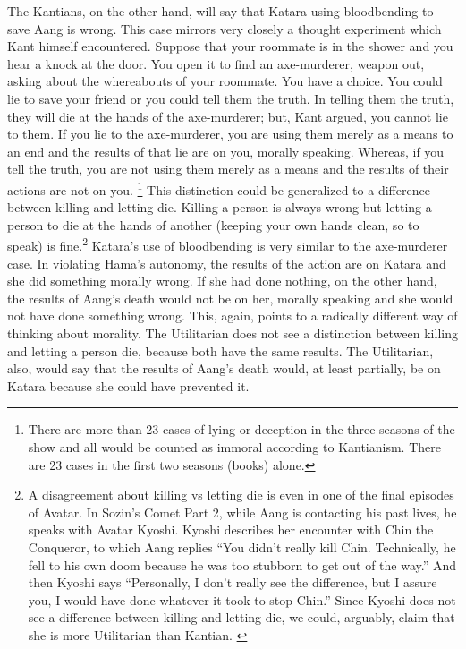 The Kantians, on the other hand, will say that Katara using bloodbending to save Aang is wrong. This case mirrors very closely a thought experiment which Kant himself encountered. Suppose that your roommate is in the shower and you hear a knock at the door. You open it to find an axe-murderer, weapon out, asking about the whereabouts of your roommate. You have a choice. You could lie to save your friend or you could tell them the truth. In telling them the truth, they will die at the hands of the axe-murderer; but, Kant argued, you cannot lie to them. If you lie to the axe-murderer, you are using them merely as a means to an end and the results of that lie are on you, morally speaking. Whereas, if you tell the truth, you are not using them merely as a means and the results of their actions are not on you.\autocite[346-350]{Beck1} \footnote{There are more than 23 cases of lying or deception in the three seasons of the show and all would be counted as immoral according to Kantianism. There are 23 cases in the first two seasons (books) alone.} This distinction could be generalized to a difference between killing and letting die. Killing a person is always wrong but letting a person to die at the hands of another (keeping your own hands clean, so to speak) is fine.\footnote{A disagreement about killing vs letting die is even in one of the final episodes of Avatar. In Sozin’s Comet Part 2, while Aang is contacting his past lives, he speaks with Avatar Kyoshi. Kyoshi describes her encounter with Chin the Conqueror, to which Aang replies “You didn't really kill Chin. Technically, he fell to his own doom because he was too stubborn to get out of the way.” And then Kyoshi says “Personally, I don't really see the difference, but I assure you, I would have done whatever it took to stop Chin.” Since Kyoshi does not see a difference between killing and letting die, we could, arguably, claim that she is more Utilitarian than Kantian. \cite[32:59-33:13]{Sozen1}} Katara’s use of bloodbending is very similar to the axe-murderer case. In violating Hama’s autonomy, the results of the action are on Katara and she did something morally wrong. If she had done nothing, on the other hand, the results of Aang’s death would not be on her, morally speaking and she would not have done something wrong. This, again, points to a radically different way of thinking about morality. The Utilitarian does not see a distinction between killing and letting a person die, because both have the same results. The Utilitarian, also, would say that the results of Aang’s death would, at least partially, be on Katara because she could have prevented it.

